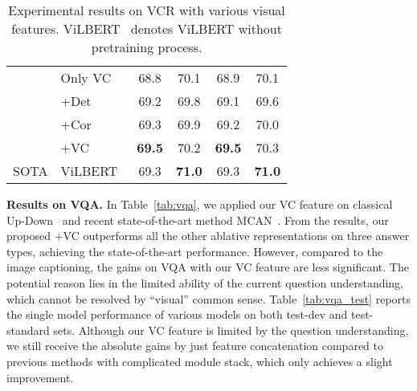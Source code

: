 \documentclass[10pt,twocolumn,letterpaper]{article}
\begin{document}
\begin{table}[]
{\begin{tabular}{p{0.8cm}lcccc}
                         & Only VC                                     &68.8           &70.1         &68.9         &70.1          \\
                         & +Det                         & 69.2         & 69.8           & 69.1      & 69.6       \\
                         & +Cor                             & 69.3         & 69.9         & 69.2           & 70.0           \\
                         & \cellcolor{mygray}+VC                              & \cellcolor{mygray}\textbf{69.5}         & \cellcolor{mygray}70.2        & \cellcolor{mygray}\textbf{69.5}           & \cellcolor{mygray}70.3           \\ \hline
SOTA                     & ViLBERT~\cite{lu2019vilbert}                                      & 69.3         & \textbf{71.0}         & 69.3           & \textbf{71.0}           \\ \hline\hline
\end{tabular}}
\caption{Experimental results on VCR with various visual features. ViLBERT~\cite{lu2019vilbert} denotes ViLBERT without pretraining process.}
\label{tab:vcr}
\vspace{-0.4cm}
\end{table}






\noindent\textbf{Results on VQA.}
In Table~\ref{tab:vqa}, we applied our VC feature on classical Up-Down~\cite{anderson2018bottom} and recent state-of-the-art method MCAN~\cite{yu2019deep}.
From the results, our proposed +VC outperforms all the other ablative representations on three answer types, achieving the state-of-the-art performance.
However, compared to the image captioning, the gains on VQA with our VC feature are less significant.
The potential reason lies in the limited ability of the current question understanding, which cannot be resolved by ``visual'' common sense.
Table~\ref{tab:vqa_test} reports the single model performance of various models on both test-dev and test-standard sets.
Although our VC feature is limited by the question understanding, we still receive the absolute gains by just feature concatenation compared to previous methods with complicated module stack, which only achieves a slight improvement.
\end{document}
